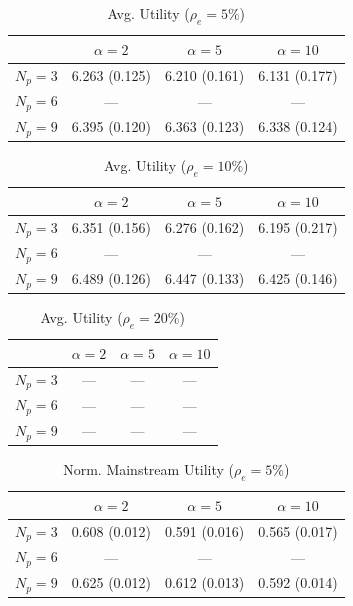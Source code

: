 \begin{table}[htbp]
\centering
\begin{tabular}{lccc}
\toprule
 & $\alpha=2$ & $\alpha=5$ & $\alpha=10$ \\
\midrule
$N_p=3$ & 6.263 (0.125) & 6.210 (0.161) & 6.131 (0.177) \\
$N_p=6$ & --- & --- & --- \\
$N_p=9$ & 6.395 (0.120) & 6.363 (0.123) & 6.338 (0.124) \\
\bottomrule
\end{tabular}
\caption{Avg. Utility ($\rho_e=5\%$)}
\label{tab:exp2_avg_utility_rho5}
\end{table}


\begin{table}[htbp]
\centering
\begin{tabular}{lccc}
\toprule
 & $\alpha=2$ & $\alpha=5$ & $\alpha=10$ \\
\midrule
$N_p=3$ & 6.351 (0.156) & 6.276 (0.162) & 6.195 (0.217) \\
$N_p=6$ & --- & --- & --- \\
$N_p=9$ & 6.489 (0.126) & 6.447 (0.133) & 6.425 (0.146) \\
\bottomrule
\end{tabular}
\caption{Avg. Utility ($\rho_e=10\%$)}
\label{tab:exp2_avg_utility_rho10}
\end{table}


\begin{table}[htbp]
\centering
\begin{tabular}{lccc}
\toprule
 & $\alpha=2$ & $\alpha=5$ & $\alpha=10$ \\
\midrule
$N_p=3$ & --- & --- & --- \\
$N_p=6$ & --- & --- & --- \\
$N_p=9$ & --- & --- & --- \\
\bottomrule
\end{tabular}
\caption{Avg. Utility ($\rho_e=20\%$)}
\label{tab:exp2_avg_utility_rho20}
\end{table}


\begin{table}[htbp]
\centering
\begin{tabular}{lccc}
\toprule
 & $\alpha=2$ & $\alpha=5$ & $\alpha=10$ \\
\midrule
$N_p=3$ & 0.608 (0.012) & 0.591 (0.016) & 0.565 (0.017) \\
$N_p=6$ & --- & --- & --- \\
$N_p=9$ & 0.625 (0.012) & 0.612 (0.013) & 0.592 (0.014) \\
\bottomrule
\end{tabular}
\caption{Norm. Mainstream Utility ($\rho_e=5\%$)}
\label{tab:exp2_norm_utility_mainstream_rho5}
\end{table}


